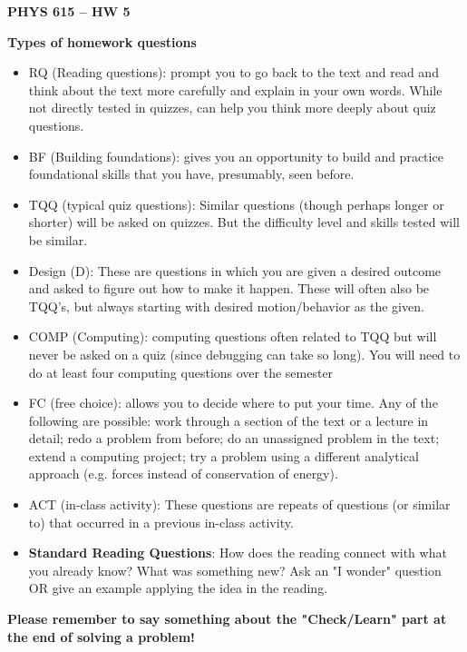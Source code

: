 \documentclass[12pt]{article}
\newcommand{\shortlist}{%
\parindent 0in%
\parskip   0in%
\itemsep   0in%
\topsep    0in%
\parsep    0in%
}
\newcommand{\Title}{PHYS 615 -- HW 5}
\begin{document}
\begin{center}
    {\Large\bfseries\Title}

\end{center}
\bigskip
\bigskip

\textbf{Types of homework questions}
\begin{itemize}\shortlist
    \item	RQ (Reading questions):  prompt you to go back to the text and read and think about the text more carefully and explain in your own words. While not directly tested in quizzes, can help you think more deeply about quiz questions.
    \item	BF (Building foundations):  gives you an opportunity to build and practice foundational skills that you have, presumably, seen before.
    \item	TQQ (typical quiz questions):   Similar questions (though perhaps longer or shorter) will be asked on quizzes.  But the difficulty level and skills tested will be similar.
    \item Design (D):  These are questions in which you are given a desired outcome and asked to figure out how to make it happen.  These will often also be TQQ’s, but always starting with desired motion/behavior as the given.
    \item	COMP (Computing): computing questions often related to TQQ but will never be asked on a quiz (since debugging can take so long).  You will need to do at least four computing questions over the semester
    \item	FC (free choice): allows you to decide where to put your time.  Any of the following are possible:  work through a section of the text or a lecture in detail; redo a problem from before; do an unassigned problem in the text; extend a computing project; try a problem using a different analytical approach (e.g. forces instead of conservation of energy).
    \item ACT (in-class activity): These questions are repeats of questions (or similar to) that occurred in a previous in-class activity.
    \item \textbf{Standard Reading Questions}: How does the reading connect with what you already know? What was something new?  Ask an "I wonder" question OR give an example applying the idea in the reading.
\end{itemize}

\textbf{Please remember to say something about the "Check/Learn" part at the end of solving a problem!}
\end{document}
